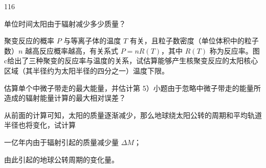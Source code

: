 \begin{problem}[第36届全国中学生物理竞赛决赛][构建太阳模型]{116}
\begin{subproblem}
\begin{subsubproblem}
        \end{subsubproblem}
        \begin{subsubproblem}
            单位时间太阳由于辐射减少多少质量？
        \end{subsubproblem}
    \end{subproblem}
    \begin{subproblem}
        聚变反应的概率 $P$ 与等离子体的温度 $T$ 有关，且粒子数密度（单位体积中的粒子数）$n$ 越高反应概率越高，有关系式 $P = nR(T)$，其中 $R(T)$ 称为反应率。图c给出了三种聚变的反应率与温度的关系，试估算能够产生核聚变反应的太阳核心区域（其半径约为太阳半径的四分之一）温度下限。
    \end{subproblem}
    \begin{subproblem}
        估算单个中微子带走的最大能量，并估计第 5）小题由于忽略中微子带走的能量所造成的辐射能量计算的最大相对误差？
    \end{subproblem}
    \begin{subproblem}
        从前面的计算可知，太阳的质量逐渐减少，那么地球绕太阳公转的周期和平均轨道半径也将变化，试计算
        \begin{subsubproblem}
            一亿年内由于辐射引起的质量减少量 $\Delta M$；
        \end{subsubproblem}
        \begin{subsubproblem}
            由此引起的地球公转周期的变化量。
        \end{subsubproblem}
    \end{subproblem}
\end{problem}